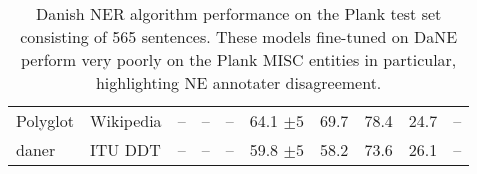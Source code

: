 \documentclass[main.tex]{subfiles}
\begin{document}
\begin{table}[H]
\begin{center}
\begin{tabular}{l l | c c c c | c c c c}
                        Polyglot      & Wikipedia      & --                   & --            & --            & 64.1         $\pm 5$& 69.7          & 78.4            & 24.7          & -- \\
                        daner         & ITU DDT        & --                   & --            & --            & 59.8         $\pm 5$& 58.2          & 73.6            & 26.1          & --
                \end{tabular}
        \end{center}
        \caption{
            Danish NER algorithm performance on the Plank \cite{plank2019neural} test set consisting of 565 sentences.
            These models fine-tuned on DaNE perform very poorly on the Plank MISC entities in particular, highlighting NE annotater disagreement.
        }
        \label{tab:Plank}
\end{table}


\end{document}
